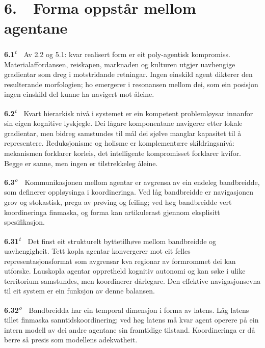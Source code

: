 \documentclass[10pt]{article}
\begin{document}
\chapter*{6.~~Forma oppstår mellom agentane}




\noindent\textbf{6.1}\textsuperscript{\textit{t}}~~Av 2.2 og 5.1: kvar realisert form er eit poly-agentisk kompromiss. Materialaffordansen, reiskapen, marknaden og kulturen utgjer uavhengige gradientar som dreg i motstridande retningar. Ingen einskild agent dikterer den resulterande morfologien; ho emergerer i resonansen mellom dei, som ein posisjon ingen einskild del kunne ha navigert mot åleine.




\noindent\textbf{6.2}\textsuperscript{\textit{t}}~~Kvart hierarkisk nivå i systemet er ein kompetent problemløysar innanfor sin eigen kognitive lyskjegle. Dei lågare komponentane navigerer etter lokale gradientar, men bidreg samstundes til mål dei sjølve manglar kapasitet til å representere. Reduksjonisme og holisme er komplementære skildringsnivå: mekanismen forklarer korleis, det intelligente kompromisset forklarer kvifor. Begge er sanne, men ingen er tilstrekkeleg åleine.




\noindent\textbf{6.3}\textsuperscript{\textit{o}}~~Kommunikasjonen mellom agentar er avgrensa av ein endeleg bandbreidde, som definerer oppløysinga i koordineringa. Ved låg bandbreidde er navigasjonen grov og stokastisk, prega av prøving og feiling; ved høg bandbreidde vert koordineringa finmaska, og forma kan artikulerast gjennom eksplisitt spesifikasjon.




\noindent\textbf{6.31}\textsuperscript{\textit{t}}~~Det finst eit strukturelt byttetilhøve mellom bandbreidde og uavhengigheit. Tett kopla agentar konvergerer mot eit felles representasjonsformat som avgrensar kva regionar av formrommet dei kan utforske. Lauskopla agentar oppretheld kognitiv autonomi og kan søke i ulike territorium samstundes, men koordinerer dårlegare. Den effektive navigasjonsevna til eit system er ein funksjon av denne balansen.




\noindent\textbf{6.32}\textsuperscript{\textit{o}}~~Bandbreidda har ein temporal dimensjon i forma av latens. Låg latens tillet finmaska sanntidskoordinering; ved høg latens må kvar agent operere på ein intern modell av dei andre agentane sin framtidige tilstand. Koordineringa er då berre så presis som modellens adekvatheit.
\end{document}
